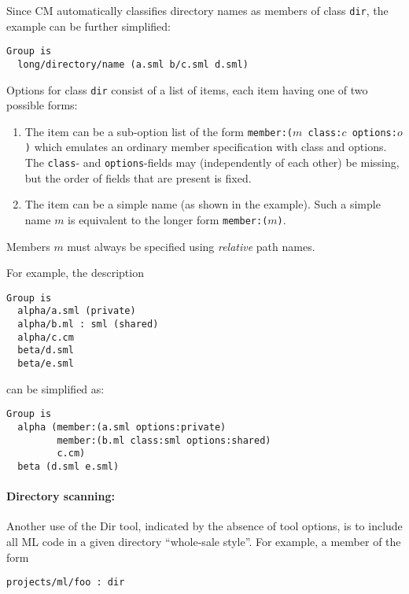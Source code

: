Since CM automatically classifies directory names as members of class
{\tt dir}, the example can be further simplified:

\begin{lstlisting}[language=CM]
Group is
  long/directory/name (a.sml b/c.sml d.sml)
\end{lstlisting}%

Options for class {\tt dir} consist of a list of items, each item
having one of two possible forms:

\begin{enumerate}
\item The item can be a sub-option list of the form
{\tt member:($m$ class:$c$ options:$o$)} which emulates an ordinary
member specification with class and options.  The {\tt class}- and
{\tt options}-fields may (independently of each other) be missing, but
the order of fields that are present is fixed.
\item The item can be a simple name (as shown in the example).  Such a
simple name $m$ is equivalent to the longer form {\tt member:($m$)}.
\end{enumerate}

Members $m$ must always be specified using {\em relative} path names.

For example, the description

\begin{lstlisting}[language=CM]
Group is
  alpha/a.sml (private)
  alpha/b.ml : sml (shared)
  alpha/c.cm
  beta/d.sml
  beta/e.sml
\end{lstlisting}%

can be simplified as:

\begin{lstlisting}[language=CM]
Group is
  alpha (member:(a.sml options:private)
         member:(b.ml class:sml options:shared)
         c.cm)
  beta (d.sml e.sml)
\end{lstlisting}%

\paragraph{Directory scanning:}
Another use of the Dir tool, indicated by the absence of tool options,
is to include all ML code in a given directory ``whole-sale style''.
For example, a member of the form

\begin{lstlisting}[language=CM]
  projects/ml/foo : dir
\end{lstlisting}%

